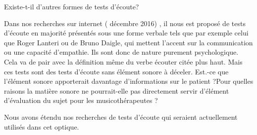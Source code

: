\documentclass[12pt,french]{report}
\begin{document}
Existe-t-il d'autres formes de tests d'écoute?

Dans nos recherches sur internet ( décembre 2016) , il nous est proposé
de tests d'écoute en majorité présentés sous une forme verbale tels
que par exemple celui que Roger Lanteri ou de Bruno Daigle, qui mettent
l'accent sur la communication ou une capacité d'empathie. Ils sont
donc de nature purement psychologique. Cela va de pair avec la définition
même du verbe écouter citée plus haut. Mais ces tests sont des tests
d'écoute sans élément sonore à déceler. Est.-ce que l'élément sonore
apporterait davantage d'informations sur le patient ?Pour quelles
raisons la matière sonore ne pourrait-elle pas directement servir
d'élément d'évaluation du sujet pour les musicothérapeutes ? 

Nous avons étendu nos recherches de tests d'écoute qui seraient actuellement
utilisés dans cet optique.
\end{document}
